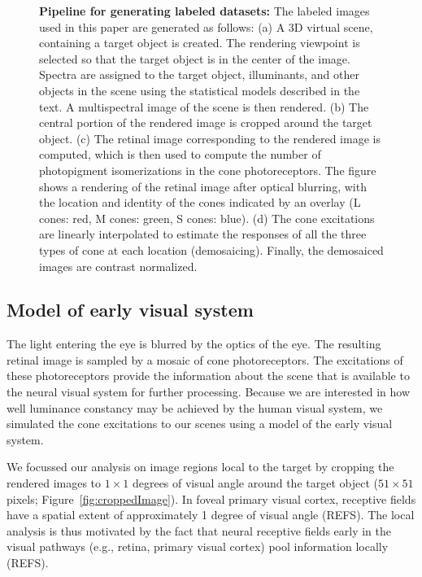 \documentclass{jov}
\begin{document}
\begin{figure}
\begin{subfigure}[b]{0.2 \textwidth}
        \label{fig:coneContrast}
    \end{subfigure}
    \label{fig:sceneWithCroppedImage}
    \caption{{\bf Pipeline for generating labeled datasets:}  The labeled images used in this paper are generated as follows: (a) A 3D virtual scene, containing a target object is created. The rendering viewpoint is selected so that the target object is in the center of the image. Spectra are assigned to the target object, illuminants, and other objects in the scene using the statistical models described in the text. A multispectral image of the scene is then rendered. (b) The central portion of the rendered image is cropped around the target object. (c) The retinal image corresponding to the rendered image is computed, which is then used to compute the number of photopigment isomerizations in the cone photoreceptors. The figure shows a rendering of the retinal image after optical blurring, with the location and identity of the cones indicated by an overlay (L cones: red, M cones: green, S cones: blue).  (d) The cone excitations are linearly interpolated to estimate the responses of all the three types of cone at each location (demosaicing). Finally, the demosaiced images are contrast normalized.}
\end{figure}

\subsection{Model of early visual system} \label{method:Isetbio}
The light entering the eye is blurred by the optics of the eye.
The resulting retinal image is sampled by a mosaic of cone photoreceptors.
The excitations of these photoreceptors provide the information about the scene that is available to the neural visual system for further processing.
Because we are interested in how well luminance constancy may be achieved by the human visual system, we simulated the cone excitations
to our scenes using a model of the early visual system.

We focussed our analysis on image regions local to the target by cropping the rendered images to $1 \times 1$ degrees of visual angle around the target object ($51 \times 51$ pixels; Figure~\ref{fig:croppedImage}). In foveal primary visual cortex, receptive fields have a spatial extent of approximately 1 degree of visual angle (REFS). 
The local analysis is thus motivated by the fact that neural receptive fields early in the visual pathways (e.g., retina, primary visual cortex) pool information locally (REFS).
\end{document}
